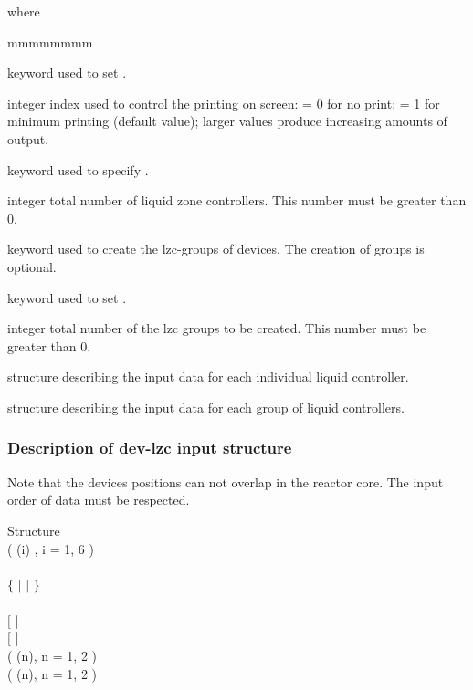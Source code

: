 \noindent where
\begin{ListeDeDescription}{mmmmmmmm}

\item[\moc{EDIT}] keyword used to set .

\item[\dusa{iprint}] integer index used to control the printing on screen:
= 0 for no print; = 1 for minimum printing (default value); larger values
produce increasing amounts of output.

\item[\moc{NUM-LZC}] keyword used to specify .

\item[\dusa{nlzc}] integer total number of liquid zone controllers.
This number must be greater than 0.

\item[\moc{CREATE}] keyword used to create the lzc-groups of devices.
The creation of groups is optional.

\item[\moc{LZC-GR}] keyword used to set .

\item[\dusa{ngrp}] integer total number of the lzc groups to be created.
This number must be greater than 0.

\item[\dstr{dev-lzc}] structure describing the input data for each individual
liquid controller.
 
\item[\dstr{lzc-group}] structure describing the input data for each group of
liquid controllers.

\end{ListeDeDescription}

\vskip 0.2cm

\subsubsection{Description of dev-lzc input structure}\label{sect:devlzcstr}

Note that the devices positions can not overlap in the reactor core. The input order of data
must be respected.

\begin{DataStructure}{Structure }
  \\
  ( (i) , i = 1, 6 ) \\
  \\
 $\{$  $|$  $|$  $\}$ \\
  \\
$[$   $]$ \\
$[$   $]$ \\
  ( (n), n = 1, 2 ) \\
  ( (n), n = 1, 2 )
\end{DataStructure}


